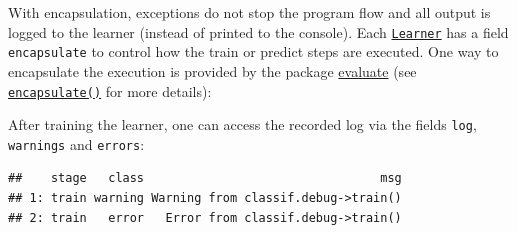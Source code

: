 \documentclass[]{scrbook}
\newenvironment{Shaded}{\begin{snugshade}}{\end{snugshade}}
\newcommand{\DataTypeTok}[1]{\textcolor[rgb]{0.13,0.29,0.53}{#1}}
\newcommand{\DecValTok}[1]{\textcolor[rgb]{0.00,0.00,0.81}{#1}}
\newcommand{\KeywordTok}[1]{\textcolor[rgb]{0.13,0.29,0.53}{\textbf{#1}}}
\newcommand{\NormalTok}[1]{#1}
\newcommand{\OperatorTok}[1]{\textcolor[rgb]{0.81,0.36,0.00}{\textbf{#1}}}
\newcommand{\StringTok}[1]{\textcolor[rgb]{0.31,0.60,0.02}{#1}}
\renewenvironment{Shaded} {\begin{snugshade}\small} {\end{snugshade}}
\begin{document}
With encapsulation, exceptions do not stop the program flow and all output is logged to the learner (instead of printed to the console).
Each \href{https://mlr3.mlr-org.com/reference/Learner.html}{\texttt{Learner}} has a field \texttt{encapsulate} to control how the train or predict steps are executed.
One way to encapsulate the execution is provided by the package \href{https://cran.r-project.org/package=evaluate}{evaluate} (see \href{https://mlr3misc.mlr-org.com/reference/encapsulate.html}{\texttt{encapsulate()}} for more details):

\begin{Shaded}
\end{Shaded}

After training the learner, one can access the recorded log via the fields \texttt{log}, \texttt{warnings} and \texttt{errors}:

\begin{Shaded}
\end{Shaded}

\begin{verbatim}
##    stage   class                                 msg
## 1: train warning Warning from classif.debug->train()
## 2: train   error   Error from classif.debug->train()
\end{verbatim}

\begin{Shaded}
\end{Shaded}
\end{document}
